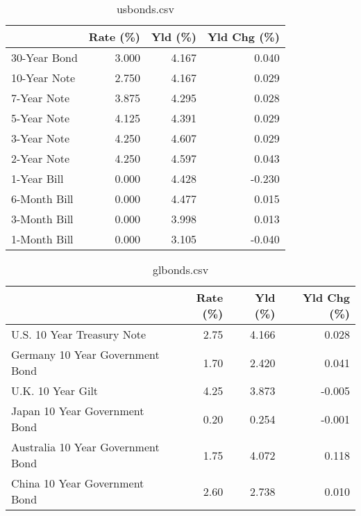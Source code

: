 \documentclass{article}%
\begin{document}
%


\begin{table}[htbp]%
\caption{usbonds.csv}%
\centering%
\begin{adjustbox}{width=1\textwidth}%
\begin{tabular}{lrrr}
\toprule
             &  Rate (\%) &  Yld (\%) &  Yld Chg (\%) \\
\midrule
30-Year Bond &     3.000 &    4.167 &        0.040 \\
10-Year Note &     2.750 &    4.167 &        0.029 \\
 7-Year Note &     3.875 &    4.295 &        0.028 \\
 5-Year Note &     4.125 &    4.391 &        0.029 \\
 3-Year Note &     4.250 &    4.607 &        0.029 \\
 2-Year Note &     4.250 &    4.597 &        0.043 \\
 1-Year Bill &     0.000 &    4.428 &       -0.230 \\
6-Month Bill &     0.000 &    4.477 &        0.015 \\
3-Month Bill &     0.000 &    3.998 &        0.013 \\
1-Month Bill &     0.000 &    3.105 &       -0.040 \\
\bottomrule
\end{tabular}
%
\end{adjustbox}%
\end{table}

%


\begin{table}[htbp]%
\caption{glbonds.csv}%
\centering%
\begin{adjustbox}{width=1\textwidth}%
\begin{tabular}{lrrr}
\toprule
                                  &  Rate (\%) &  Yld (\%) &  Yld Chg (\%) \\
\midrule
       U.S. 10 Year Treasury Note &      2.75 &    4.166 &        0.028 \\
  Germany 10 Year Government Bond &      1.70 &    2.420 &        0.041 \\
                U.K. 10 Year Gilt &      4.25 &    3.873 &       -0.005 \\
    Japan 10 Year Government Bond &      0.20 &    0.254 &       -0.001 \\
Australia 10 Year Government Bond &      1.75 &    4.072 &        0.118 \\
    China 10 Year Government Bond &      2.60 &    2.738 &        0.010 \\
\bottomrule
\end{tabular}
%
\end{adjustbox}%
\end{table}
\end{document}
